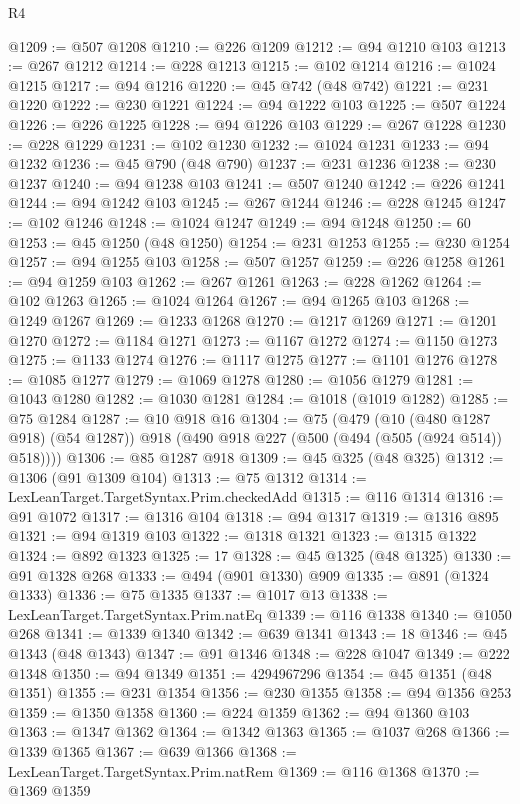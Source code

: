\begin{lexlean}{R4}
\begin{coremodule}
@1209 := @507 @1208
@1210 := @226 @1209
@1212 := @94 @1210 @103
@1213 := @267 @1212
@1214 := @228 @1213
@1215 := @102 @1214
@1216 := @1024 @1215
@1217 := @94 @1216
@1220 := @45 @742 (@48 @742)
@1221 := @231 @1220
@1222 := @230 @1221
@1224 := @94 @1222 @103
@1225 := @507 @1224
@1226 := @226 @1225
@1228 := @94 @1226 @103
@1229 := @267 @1228
@1230 := @228 @1229
@1231 := @102 @1230
@1232 := @1024 @1231
@1233 := @94 @1232
@1236 := @45 @790 (@48 @790)
@1237 := @231 @1236
@1238 := @230 @1237
@1240 := @94 @1238 @103
@1241 := @507 @1240
@1242 := @226 @1241
@1244 := @94 @1242 @103
@1245 := @267 @1244
@1246 := @228 @1245
@1247 := @102 @1246
@1248 := @1024 @1247
@1249 := @94 @1248
@1250 := 60
@1253 := @45 @1250 (@48 @1250)
@1254 := @231 @1253
@1255 := @230 @1254
@1257 := @94 @1255 @103
@1258 := @507 @1257
@1259 := @226 @1258
@1261 := @94 @1259 @103
@1262 := @267 @1261
@1263 := @228 @1262
@1264 := @102 @1263
@1265 := @1024 @1264
@1267 := @94 @1265 @103
@1268 := @1249 @1267
@1269 := @1233 @1268
@1270 := @1217 @1269
@1271 := @1201 @1270
@1272 := @1184 @1271
@1273 := @1167 @1272
@1274 := @1150 @1273
@1275 := @1133 @1274
@1276 := @1117 @1275
@1277 := @1101 @1276
@1278 := @1085 @1277
@1279 := @1069 @1278
@1280 := @1056 @1279
@1281 := @1043 @1280
@1282 := @1030 @1281
@1284 := @1018 (@1019 @1282)
@1285 := @75 @1284
@1287 := @10 @918 @16
@1304 := @75
    (@479
      (@10 (@480 @1287 @918) (@54 @1287))
      @918
      (@490 @918 @227 (@500 (@494 (@505 (@924 @514)) @518))))
@1306 := @85 @1287 @918
@1309 := @45 @325 (@48 @325)
@1312 := @1306 (@91 @1309 @104)
@1313 := @75 @1312
@1314 := LexLeanTarget.TargetSyntax.Prim.checkedAdd
@1315 := @116 @1314
@1316 := @91 @1072
@1317 := @1316 @104
@1318 := @94 @1317
@1319 := @1316 @895
@1321 := @94 @1319 @103
@1322 := @1318 @1321
@1323 := @1315 @1322
@1324 := @892 @1323
@1325 := 17
@1328 := @45 @1325 (@48 @1325)
@1330 := @91 @1328 @268
@1333 := @494 (@901 @1330) @909
@1335 := @891 (@1324 @1333)
@1336 := @75 @1335
@1337 := @1017 @13
@1338 := LexLeanTarget.TargetSyntax.Prim.natEq
@1339 := @116 @1338
@1340 := @1050 @268
@1341 := @1339 @1340
@1342 := @639 @1341
@1343 := 18
@1346 := @45 @1343 (@48 @1343)
@1347 := @91 @1346
@1348 := @228 @1047
@1349 := @222 @1348
@1350 := @94 @1349
@1351 := 4294967296
@1354 := @45 @1351 (@48 @1351)
@1355 := @231 @1354
@1356 := @230 @1355
@1358 := @94 @1356 @253
@1359 := @1350 @1358
@1360 := @224 @1359
@1362 := @94 @1360 @103
@1363 := @1347 @1362
@1364 := @1342 @1363
@1365 := @1037 @268
@1366 := @1339 @1365
@1367 := @639 @1366
@1368 := LexLeanTarget.TargetSyntax.Prim.natRem
@1369 := @116 @1368
@1370 := @1369 @1359

\end{coremodule}
\end{lexlean}
